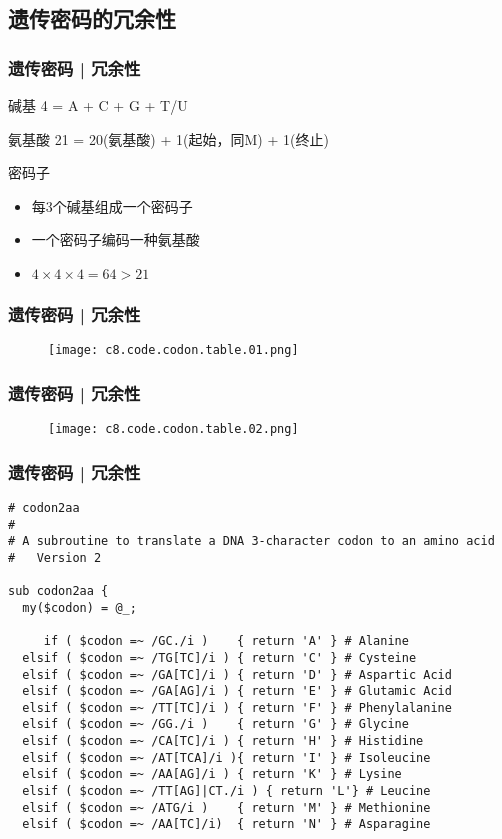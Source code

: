 \subsection{遗传密码的冗余性}
\begin{frame}
  \frametitle{遗传密码 | 冗余性}
  \begin{block}{碱基}
    4 = A + C + G + T/U
  \end{block}
  \pause
  \begin{block}{氨基酸}
    21 = 20(氨基酸) + 1(起始，同M) + 1(终止)
  \end{block}
  \pause
  \begin{block}{密码子}
    \begin{itemize}
      \item 每3个碱基组成一个密码子
      \item 一个密码子编码一种氨基酸
      \item $4 \times 4 \times 4 = 64 > 21$
    \end{itemize}
  \end{block}
\end{frame}

\begin{frame}
  \frametitle{遗传密码 | 冗余性}
  \begin{figure}
    \centering
    \texttt{[image: c8.code.codon.table.01.png]}
  \end{figure}
\end{frame}

\begin{frame}
  \frametitle{遗传密码 | 冗余性}
  \begin{figure}
    \centering
    \texttt{[image: c8.code.codon.table.02.png]}
  \end{figure}
\end{frame}

\begin{frame}[fragile]
  \frametitle{遗传密码 | 冗余性}
\begin{lstlisting}[firstnumber=1,basicstyle=\scriptsize\tt,numberstyle=\tiny]
# codon2aa
#
# A subroutine to translate a DNA 3-character codon to an amino acid
#   Version 2

sub codon2aa {
  my($codon) = @_;
     
     if ( $codon =~ /GC./i )    { return 'A' } # Alanine
  elsif ( $codon =~ /TG[TC]/i ) { return 'C' } # Cysteine
  elsif ( $codon =~ /GA[TC]/i ) { return 'D' } # Aspartic Acid
  elsif ( $codon =~ /GA[AG]/i ) { return 'E' } # Glutamic Acid
  elsif ( $codon =~ /TT[TC]/i ) { return 'F' } # Phenylalanine
  elsif ( $codon =~ /GG./i )    { return 'G' } # Glycine
  elsif ( $codon =~ /CA[TC]/i ) { return 'H' } # Histidine
  elsif ( $codon =~ /AT[TCA]/i ){ return 'I' } # Isoleucine
  elsif ( $codon =~ /AA[AG]/i ) { return 'K' } # Lysine
  elsif ( $codon =~ /TT[AG]|CT./i ) { return 'L'} # Leucine
  elsif ( $codon =~ /ATG/i )    { return 'M' } # Methionine
  elsif ( $codon =~ /AA[TC]/i)  { return 'N' } # Asparagine
\end{lstlisting}
\end{frame}

